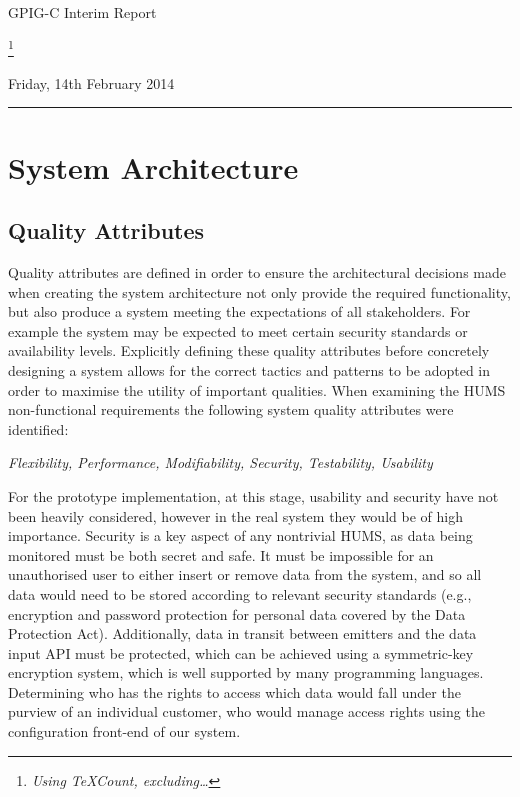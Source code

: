 \documentclass[10pt,a4paper]{article}
\begin{document}
\begin{center}
{\Large GPIG-C Interim Report}

\footnote{\textit{Using TeXCount, excluding\ldots}} %

Friday, 14th February 2014
\end{center}

\vspace{0.3cm}
\rule{\textwidth}{0.4pt}




\section{System Architecture}
\label{sec:architecture}

\subsection{Quality Attributes}
\label{sec:architecture-quality}

Quality attributes are defined in order to ensure the architectural decisions 
made when creating the system architecture not only provide the required 
functionality, but also produce a system meeting the expectations of all 
stakeholders. For example the system may be expected to meet certain 
security standards or availability levels. Explicitly defining these quality 
attributes before concretely designing a system allows for the correct 
tactics and patterns to be adopted in order to maximise the utility of important 
qualities. When examining the HUMS non-functional requirements the 
following system quality attributes were identified:
	\begin{center}
	\textit{Flexibility, Performance, Modifiability, Security, 
Testability, Usability}
	\end{center}
For the prototype implementation, at this stage, usability and security 
have not been heavily considered, however in the real system they 
would be of high importance. Security is a key aspect of any nontrivial HUMS, 
as data being monitored must be both secret and safe. It must be impossible 
for an unauthorised user to either insert or remove data from the system, and 
so all data would need to be stored according to relevant security standards 
(e.g., encryption and password protection for personal data covered by the 
Data Protection Act). Additionally, data in transit between emitters and the data 
input API must be protected, which can be achieved using a symmetric-key 
encryption system, which is well supported by many programming languages. 
Determining who has the rights to access which data would fall under the 
purview of an individual customer, who would manage access rights using the 
configuration front-end of our system.
\end{document}
